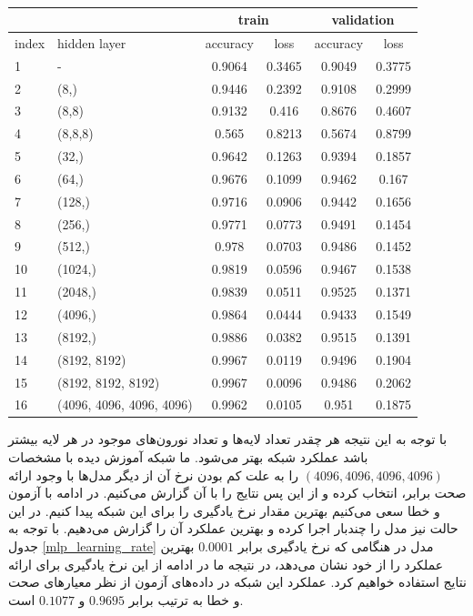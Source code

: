 \documentclass[12pt, a4paper]{article}
\begin{document}
\begin{latin}
\begin{table}[!ht]
    \centering
    \caption{}
    \label{mlp_performance}
    \begin{tabular}{|l|l|c|c|c|c|}
    \hline
        & & \multicolumn{2}{c|}{train} & \multicolumn{2}{c|}{validation}  \\ \hline
        index & hidden layer & accuracy & loss & accuracy & loss \\ \hline
        1 & - & 0.9064 & 0.3465 & 0.9049 & 0.3775 \\ \hline
        2 & (8,) & 0.9446 & 0.2392 & 0.9108 & 0.2999 \\ \hline
        3 & (8,8) & 0.9132 & 0.416 & 0.8676 & 0.4607 \\ \hline
        4 & (8,8,8) & 0.565 & 0.8213 & 0.5674 & 0.8799 \\ \hline
        5 & (32,) & 0.9642 & 0.1263 & 0.9394 & 0.1857 \\ \hline
        6 & (64,) & 0.9676 & 0.1099 & 0.9462 & 0.167 \\ \hline
        7 & (128,) & 0.9716 & 0.0906 & 0.9442 & 0.1656 \\ \hline
        8 & (256,) & 0.9771 & 0.0773 & 0.9491 & 0.1454 \\ \hline
        9 & (512,) & 0.978 & 0.0703 & 0.9486 & 0.1452 \\ \hline
        10 & (1024,) & 0.9819 & 0.0596 & 0.9467 & 0.1538 \\ \hline
        11 & (2048,) & 0.9839 & 0.0511 & 0.9525 & 0.1371 \\ \hline
        12 & (4096,) & 0.9864 & 0.0444 & 0.9433 & 0.1549 \\ \hline
        13 & (8192,) & 0.9886 & 0.0382 & 0.9515 & 0.1391 \\ \hline
        14 & (8192, 8192) & 0.9967 & 0.0119 & 0.9496 & 0.1904 \\ \hline
        15 & (8192, 8192, 8192) & 0.9967 & 0.0096 & 0.9486 & 0.2062 \\ \hline
        16 & (4096, 4096, 4096, 4096) & 0.9962 & 0.0105 & 0.951 & 0.1875 \\ \hline
    \end{tabular}
\end{table}
\end{latin}

با توجه به این نتیجه هر چقدر تعداد لایه‌ها و تعداد نورون‌های موجود در هر لایه بیشتر باشد
عملکرد شبکه بهتر می‌شود. ما شبکه آموزش دیده با مشخصات $(4096, 4096, 4096, 4096)$ را به علت
کم بودن نرخ  آن از دیگر مدل‌ها با وجود ارائه صحت برابر، انتخاب کرده و از این
پس نتایج را با آن گزارش می‌کنیم. در ادامه با آزمون و خطا سعی می‌کنیم بهترین مقدار نرخ یادگیری
را برای این شبکه پیدا کنیم. در این حالت نیز مدل را چند‌بار اجرا کرده و بهترین عملکرد آن‌ را گزارش می‌دهیم.
با توجه به جدول \ref{mlp_learning_rate}  مدل در هنگامی که نرخ یادگیری برابر $0.0001$
بهترین عملکرد را از خود نشان می‌دهد، در نتیجه ما در ادامه از این نرخ یادگیری برای ارائه نتایج استفاده خواهیم کرد.
عملکرد این شبکه در داده‌های آزمون از نظر معیار‌های صحت و خطا به ترتیب برابر $0.9695$ و $0.1077$ است.
\end{document}
